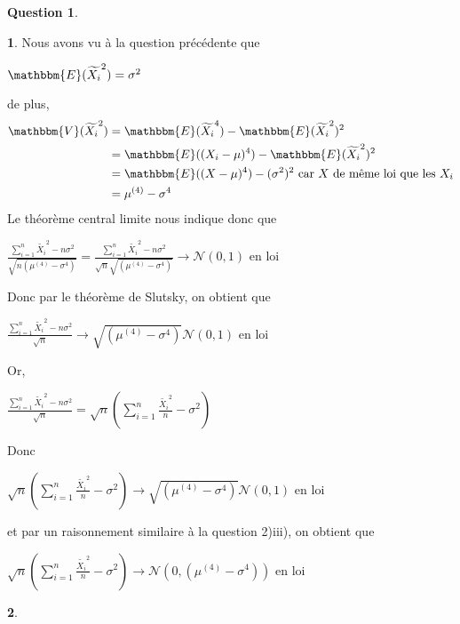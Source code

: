 \documentclass[12pt]{article}
\newcommand{\1}{\mathbbm{1}}
\newcommand{\E}{\mathbbm{E}}
\newcommand{\V}{\mathbbm{V}}
\newcommand{\Nc}{\mathcal{N}}
\newcommand{\Xti}{\widetilde{X_i}}
\theoremstyle{definition}\newtheorem{defn}{Définition}
\theoremstyle{definition}\newtheorem{exm}{Exemple}
\theoremstyle{definition}\newtheorem{rem}{Remarque}
\theoremstyle{definition}\newtheorem{algo}{Algorithme}
\theoremstyle{remark}\newtheorem{exo}{Exercice}
\theoremstyle{remark}\newtheorem{nota}{Notation}
\theoremstyle{definition}\newtheorem{1q}{Question}
\theoremstyle{definition}\newtheorem{2q}{Question}
\theoremstyle{definition}\newtheorem{3q}{Question}
\theoremstyle{definition}\newtheorem{4q}{Question}
\theoremstyle{definition}\newtheorem{2qs1}{}
\theoremstyle{definition}\newtheorem{2qs2}{}
\theoremstyle{definition}\newtheorem{2qs3}{}
\theoremstyle{definition}\newtheorem{2qs4}{}
\theoremstyle{definition}\newtheorem{4qs2}{}
\theoremstyle{definition}\newtheorem{4qs3}{}
\begin{document}
\begin{4q}
\begin{4qs3}
Nous avons vu à la question précédente que 
\begin{center}$ \E(\Xti^2) = \sigma^2$\end{center}
de plus,
\begin{align*}
\V(\Xti^2) &= \E(\Xti^4)-\E(\Xti^2)^2\\
&= \E((X_i-\mu)^4) -\E(\Xti^2)^2 \\
&= \E((X-\mu)^4) -(	\sigma^2)^2 \text{   car $X$ de même loi que les $X_i$}\\
&= \mu^{(4)} - \sigma^4
\end{align*}
Le théorème central limite nous indique donc que
\begin{center}$ \displaystyle\frac{\sum_{i=1}^n \Xti^2 - n\sigma^2}{\sqrt{n(\mu^{(4)} - \sigma^4)}} = \displaystyle\frac{\sum_{i=1}^n \Xti^2 - n\sigma^2}{\sqrt{n} \sqrt{(\mu^{(4)} - \sigma^4)}} \longrightarrow \Nc(0,1)$ en loi\end{center}
Donc par le théorème de Slutsky, on obtient que
\begin{center}$ \displaystyle\frac{\sum_{i=1}^n \Xti^2 - n\sigma^2}{\sqrt{n}} \longrightarrow\sqrt{ (\mu^{(4)} - \sigma^4)}\Nc(0,1)$ en loi\end{center}
Or, 
\begin{center}
$ \displaystyle\frac{\sum_{i=1}^n \Xti^2 - n\sigma^2}{\sqrt{n}} = \sqrt{n}\left(\displaystyle \sum_{i=1}^n \frac{\Xti^2}{n} -\sigma^2\right) $
\end{center}
Donc
\begin{center}
$\sqrt{n}\left(\displaystyle \sum_{i=1}^n \frac{\Xti^2}{n} -\sigma^2\right) \longrightarrow \sqrt{(\mu^{(4)} - \sigma^4)}\Nc(0,1)$ en loi
\end{center}
et par un raisonnement similaire à la question 2)iii), on obtient que 
\begin{center}
$\sqrt{n}\left(\displaystyle \sum_{i=1}^n \frac{\Xti^2}{n} -\sigma^2\right) \longrightarrow \Nc(0, (\mu^{(4)} - \sigma^4))$ en loi
\end{center}
\end{4qs3}

\begin{4qs3}


\end{4qs3}
\end{4q}
\end{document}
